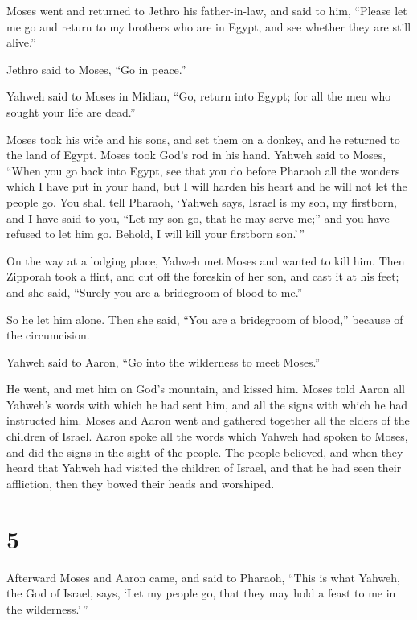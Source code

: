  Moses went and returned to Jethro his father-in-law, and
said to him, ``Please let me go and return to my brothers who are in
Egypt, and see whether they are still alive.''

Jethro said to Moses, ``Go in peace.''

 Yahweh said to Moses in Midian, ``Go, return into Egypt;
for all the men who sought your life are dead.''

 Moses took his wife and his sons, and set them on a
donkey, and he returned to the land of Egypt. Moses took God's rod in
his hand.  Yahweh said to Moses, ``When you go back into
Egypt, see that you do before Pharaoh all the wonders which I have put
in your hand, but I will harden his heart and he will not let the people
go.  You shall tell Pharaoh, `Yahweh says, Israel is my
son, my firstborn,  and I have said to you, ``Let my son
go, that he may serve me;'' and you have refused to let him go. Behold,
I will kill your firstborn son.'\,''

 On the way at a lodging place, Yahweh met Moses and wanted
to kill him.  Then Zipporah took a flint, and cut off the
foreskin of her son, and cast it at his feet; and she said, ``Surely you
are a bridegroom of blood to me.''

 So he let him alone. Then she said, ``You are a bridegroom
of blood,'' because of the circumcision.

 Yahweh said to Aaron, ``Go into the wilderness to meet
Moses.''

He went, and met him on God's mountain, and kissed him. 
Moses told Aaron all Yahweh's words with which he had sent him, and all
the signs with which he had instructed him.  Moses and
Aaron went and gathered together all the elders of the children of
Israel.  Aaron spoke all the words which Yahweh had spoken
to Moses, and did the signs in the sight of the people. 
The people believed, and when they heard that Yahweh had visited the
children of Israel, and that he had seen their affliction, then they
bowed their heads and worshiped.

\hypertarget{section-4}{%
\section{5}\label{section-4}}

 Afterward Moses and Aaron came, and said to Pharaoh, ``This
is what Yahweh, the God of Israel, says, `Let my people go, that they
may hold a feast to me in the wilderness.'\,''

